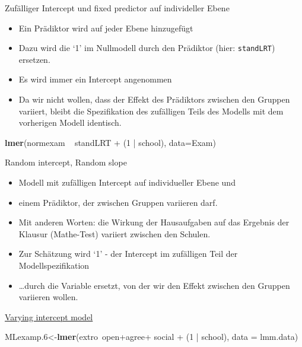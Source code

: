 \documentclass[ignorenonframetext,]{beamer}
\newenvironment{Shaded}{}{}
\newcommand{\KeywordTok}[1]{\textcolor[rgb]{0.00,0.44,0.13}{\textbf{{#1}}}}
\newcommand{\DataTypeTok}[1]{\textcolor[rgb]{0.56,0.13,0.00}{{#1}}}
\newcommand{\DecValTok}[1]{\textcolor[rgb]{0.25,0.63,0.44}{{#1}}}
\newcommand{\FloatTok}[1]{\textcolor[rgb]{0.25,0.63,0.44}{{#1}}}
\newcommand{\StringTok}[1]{\textcolor[rgb]{0.25,0.44,0.63}{{#1}}}
\newcommand{\NormalTok}[1]{{#1}}
\providecommand{\tightlist}{%
\setlength{\itemsep}{0pt}\setlength{\parskip}{0pt}}
\begin{document}
\begin{frame}[fragile]{Zufälliger Intercept und fixed predictor auf
individeller Ebene}

\begin{itemize}
\tightlist
\item
  Ein Prädiktor wird auf jeder Ebene hinzugefügt
\item
  Dazu wird die `1' im Nullmodell durch den Prädiktor (hier:
  \texttt{standLRT}) ersetzen.
\item
  Es wird immer ein Intercept angenommen
\item
  Da wir nicht wollen, dass der Effekt des Prädiktors zwischen den
  Gruppen variiert, bleibt die Spezifikation des zufälligen Teils des
  Modells mit dem vorherigen Modell identisch.
\end{itemize}

\begin{Shaded}
\begin{Highlighting}[]
\KeywordTok{lmer}\NormalTok{(normexam ~}\StringTok{ }\NormalTok{standLRT +}\StringTok{ }\NormalTok{(}\DecValTok{1} \NormalTok{|}\StringTok{ }\NormalTok{school), }\DataTypeTok{data=}\NormalTok{Exam)}
\end{Highlighting}
\end{Shaded}

\end{frame}

\begin{frame}{Random intercept, Random slope}

\begin{itemize}
\item
  Modell mit zufälligen Intercept auf individueller Ebene und
\item
  einem Prädiktor, der zwischen Gruppen variieren darf.
\item
  Mit anderen Worten: die Wirkung der Hausaufgaben auf das Ergebnis der
  Klausur (Mathe-Test) variiert zwischen den Schulen.
\item
  Zur Schätzung wird `1' - der Intercept im zufälligen Teil der
  Modellspezifikation
\item
  \ldots{}durch die Variable ersetzt, von der wir den Effekt zwischen
  den Gruppen variieren wollen.
\end{itemize}

\end{frame}

\begin{frame}[fragile]{\href{https://www.jaredknowles.com/journal/2013/11/25/getting-started-with-mixed-effect-models-in-r}{Varying
intercept model}}

\begin{Shaded}
\begin{Highlighting}[]
\NormalTok{MLexamp}\FloatTok{.6}\NormalTok{<-}\KeywordTok{lmer}\NormalTok{(extro~open+agree+}\StringTok{ }\NormalTok{social +}\StringTok{ }\NormalTok{(}\DecValTok{1} \NormalTok{|}\StringTok{ }\NormalTok{school), }
                \DataTypeTok{data =} \NormalTok{lmm.data)}
\end{Highlighting}
\end{Shaded}

\end{frame}
\end{document}
